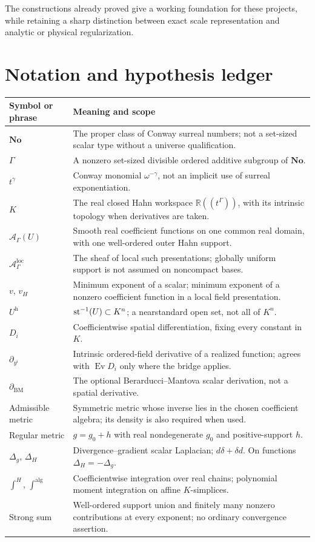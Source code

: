 \documentclass[11pt,letterpaper]{article}
\theoremstyle{definition}
\theoremstyle{remark}
\newcommand{\No}{\mathbf{No}}
\newcommand{\R}{\mathbb R}\newcommand{\C}{\mathbb C}
\newcommand{\A}{\mathscr A}\newcommand{\OO}{\mathcal O}\newcommand{\mm}{\mathfrak m}
\newcommand{\ev}{\operatorname{Ev}}\newcommand{\jet}{\operatorname{J}}
\newcommand{\halo}[1]{#1^{\mathrm h}}
\newcommand{\vH}{v_{\!H}}
\newcommand{\BM}{\partial_{\mathrm{BM}}}
\begin{document}
The constructions already proved give a working foundation for these projects,
while retaining a sharp distinction between exact scale representation and
analytic or physical regularization.

\appendix

\section{Notation and hypothesis ledger}\label{vtf:app:ledger}

\begin{longtable}{P{0.24\textwidth}P{0.68\textwidth}}
\toprule
Symbol or phrase & Meaning and scope\\
\midrule\endhead
$\No$ & The proper class of Conway surreal numbers; not a set-sized scalar type without a universe qualification.\\
$\Gamma$ & A nonzero set-sized divisible ordered additive subgroup of $\No$.\\
$t^\gamma$ & Conway monomial $\omega^{-\gamma}$, not an implicit use of surreal exponentiation.\\
$K$ & The real closed Hahn workspace $\R((t^\Gamma))$, with its intrinsic topology when derivatives are taken.\\
$\A_\Gamma(U)$ & Smooth real coefficient functions on one common real domain, with one well-ordered outer Hahn support.\\
$\A^{\mathrm{loc}}_\Gamma$ & The sheaf of local such presentations; globally uniform support is not assumed on noncompact bases.\\
$v$, $\vH$ & Minimum exponent of a scalar; minimum exponent of a nonzero coefficient function in a local field presentation.\\
$\halo U$ & $\operatorname{st}^{-1}(U)\subset K^n$; a nearstandard open set, not all of $K^n$.\\
$D_i$ & Coefficientwise spatial differentiation, fixing every constant in $K$.\\
$\partial_{y^i}$ & Intrinsic ordered-field derivative of a realized function; agrees with $\ev D_i$ only where the bridge applies.\\
$\BM$ & The optional Berarducci--Mantova scalar derivation, not a spatial derivative.\\
Admissible metric & Symmetric metric whose inverse lies in the chosen coefficient algebra; its density is also required when used.\\
Regular metric & $g=g_0+h$ with real nondegenerate $g_0$ and positive-support $h$.\\
$\Delta_g$, $\Delta_H$ & Divergence--gradient scalar Laplacian; $d\delta+\delta d$. On functions $\Delta_H=-\Delta_g$.\\
$\int^H$, $\int^{\mathrm{alg}}$ & Coefficientwise integration over real chains; polynomial moment integration on affine $K$-simplices.\\
Strong sum & Well-ordered support union and finitely many nonzero contributions at every exponent; no ordinary convergence assertion.\\


\end{longtable}
\end{document}
